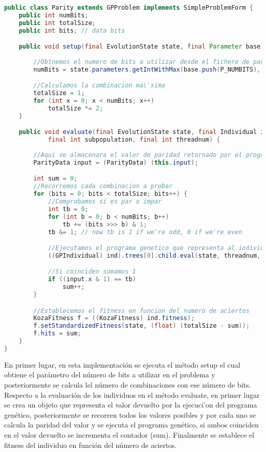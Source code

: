 \begin{lstlisting}[language=Java]
public class Parity extends GPProblem implements SimpleProblemForm {
	public int numBits;
	public int totalSize;
	public int bits; // data bits

	public void setup(final EvolutionState state, final Parameter base) {
		
		//Obtnemos el numero de bits a utilizar desde el fichero de parametros
		numBits = state.parameters.getIntWithMax(base.push(P_NUMBITS), null, 2, 31);

		//Calculamos la combinacion ma\'xima
		totalSize = 1;
		for (int x = 0; x < numBits; x++)
			totalSize *= 2;
	}

	public void evaluate(final EvolutionState state, final Individual ind,
			final int subpopulation, final int threadnum) {
		
		//Aqui se almacenara el valor de paridad retornado por el programa gen\'etico
		ParityData input = (ParityData) (this.input);

		int sum = 0;
		//Recorremos cada combinacion a probar
		for (bits = 0; bits < totalSize; bits++) {		
			//Comprobamos si es par o impar
			int tb = 0;
			for (int b = 0; b < numBits; b++)
				tb += (bits >>> b) & 1;
			tb &= 1; // now tb is 1 if we're odd, 0 if we're even

			//Ejecutamos el programa genetico que representa al individuo
			((GPIndividual) ind).trees[0].child.eval(state, threadnum, input, stack, ((GPIndividual) ind), this);

			//Si coinciden sumamos 1
			if ((input.x & 1) == tb)
				sum++;
		}

		//Establecemos el fitness en funcion del numero de aciertos
		KozaFitness f = ((KozaFitness) ind.fitness);
		f.setStandardizedFitness(state, (float) (totalSize - sum));
		f.hits = sum;
	}
}
\end{lstlisting}

En primer lugar, en esta implementación se ejecuta el método setup el cual obtiene el parámetro del n\'umero de bits a utilizar en el problema y posteriormente se calcula lel n\'umero de combinaciones con ese n\'umero de bits. Respecto a la evaluación de los individuos en el método evaluate, en primer lugar se crea un objeto que representa el valor devuelto por la ejecuci'on del programa genético, posteriormente se recorren todos los valores posibles y por cada uno se calcula la paridad del valor y se ejecuta el programa gen\'etico, si ambos coinciden en el valor devuelto se incrementa el contador (sum). Finalmente se establece el fitness del individuo en funci\'on del n\'umero de aciertos.

